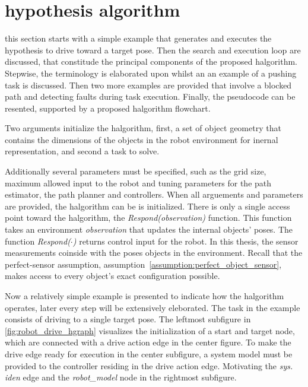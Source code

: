\section{hypothesis algorithm}%
\label{sec:halgorithm}
this section starts with a simple example that generates and executes the hypothesis to drive toward a target pose. Then the search and execution loop are discussed, that constitude the principal components of the proposed \ac{halgorithm}. Stepwise, the terminology is elaborated upon whilst an an example of a pushing task is discussed. Then two more examples are provided that involve a blocked path and detecting faults during task execution. Finally, the pseudocode can be resented, supported by a proposed \ac{halgorithm} flowchart.\bs

Two arguments initialize the \ac{halgorithm}, first, a set of object geometry that contains the dimensions of the objects in the robot environment for inernal representation, and second a task to solve.\bs

Additionally several parameters must be specified, such as the grid size, maximum allowed input to the robot and tuning parameters for the path estimator, the path planner and controllers. When all arguements and parameters are provided, the \ac{halgorithm} can be is initialized. There is only a single access point toward the \ac{halgorithm}, the \textit{Respond(observation)} function. This function takes an environment \textit{observation} that updates the internal objects' poses. The function \textit{Respond($\cdot$)} returns control input for the robot. In this thesis, the sensor measurements coinside with the poses objects in the environment. Recall that the perfect-sensor assumption, assumption~\ref{assumption:perfect_object_sensor}, makes access to every object's exact configuration possible.\bs

Now a relatively simple example is presented to indicate how the \ac{halgorithm} operates, later every step will be extensively eleborated. The task in the example consists of driving to a single target pose. The leftmost subfigure in \cref{fig:robot_drive_hgraph} visualizes the initialization of a start and target node, which are connected with a drive action edge in the center figure. To make the drive edge ready for execution in the center subfigure, a system model must be provided to the controller residing in the drive action edge. Motivating the \textit{sys. iden} edge and the \textit{robot\_model} node in the rightmost subfigure.\bs


